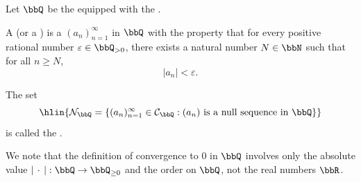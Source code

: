 \begin{definition} \label{definition:null_sequence_in_rational_numbers}
    Let $\bbQ$ be the  equipped with the .

    A  (or a ) is a  $(a_n)_{n=1}^\infty$ in $\bbQ$ with the property that for every positive rational number $\varepsilon \in \bbQ_{> 0}$, there exists a natural number $N \in \bbN$ such that for all $n \ge N$,
    $$|a_n| < \varepsilon.$$

    The set
    $$\hlin{\mathcal{N}_\bbQ = \left\{ (a_n)_{n=1}^\infty \in \mathcal{C}_\bbQ : (a_n) \text{ is a null sequence in } \bbQ \right\}}$$
    is called the .

    We note that the definition of convergence to $0$ in $\bbQ$ involves only the absolute value $|\,\cdot\,| : \bbQ \to \bbQ_{\ge 0}$ and the order on $\bbQ$, not the real numbers $\bbR$.
\end{definition}